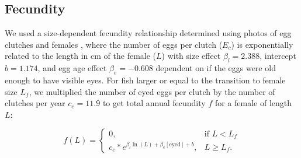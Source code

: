 \documentclass[12pt, oneside]{article}   	%
\begin{document}




\subsection{Fecundity} \label{APP_SEC_METHODS_Fecundity}

We used a size-dependent fecundity relationship determined using photos of egg clutches and females \citep{yawdoszynInPrepfecundity}, where the number of eggs per clutch ($E_c$) is exponentially related to the length in cm of the female ($L$) with size effect $\beta_l = 2.388$, intercept $b = 1.174$, and egg age effect $\beta_e = -0.608$ dependent on if the eggs were old enough to have visible eyes. For fish larger or equal to the transition to female size $L_f$, we multiplied the number of eyed eggs per clutch by the number of clutches per year $c_e = 11.9$ \citep[estimate from][]{holtswarth2017fecundity} to get total annual fecundity $f$ for a female of length $L$:

\begin{equation}
f(L) = 
\begin{cases}
0, & \text{if } L < L_f \\
c_e * e^{\beta_l\ln(L) + \beta_e[\text{eyed}] + b}, & L \geq L_f. \label{EQN_Fec}
\end{cases}
\end{equation}
\end{document}
